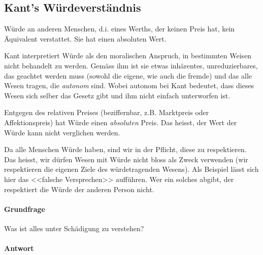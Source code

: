 \documentclass[../main.tex]{subfiles}
\begin{document}
\subsection{Kant's Würdeverständnis}
\begin{warningbox}
Würde an anderen Menschen, d.i. eines Werths, der keinen Preis hat, kein Äquivalent verstattet. Sie hat einen absoluten Wert.
\end{warningbox}

Kant interpretiert Würde als den moralischen Anspruch, in bestimmten Weisen nicht behandelt zu werden. Gemäss ihm ist sie etwas inhärentes, unreduzierbares, das geachtet werden muss (sowohl die eigene, wie auch die fremde) und das alle Wesen tragen, die \textit{autonom} sind. Wobei autonom bei Kant bedeutet, dass dieses Wesen sich selber das Gesetz gibt und ihm nicht einfach unterworfen ist. 

Entgegen des relativen Preises (beziffernbar, z.B. Marktpreis oder Affektionspreis) hat Würde einen \textit{absoluten} Preis. Das heisst, der Wert der Würde kann nicht verglichen werden. 

Da alle Menschen Würde haben, sind wir in der Pflicht, diese zu respektieren. Das heisst, wir dürfen Wesen mit Würde nicht bloss als Zweck verwenden (wir respektieren die eigenen Ziele des würdetragenden Wesens). Als Beispiel lässt sich hier das <<falsche Versprechen>> aufführen. Wer ein solches abgibt, der respektiert die Würde der anderen Person nicht. 



\paragraph{Grundfrage} Was ist alles unter Schädigung zu verstehen?

\paragraph{Antwort}
\end{document}

